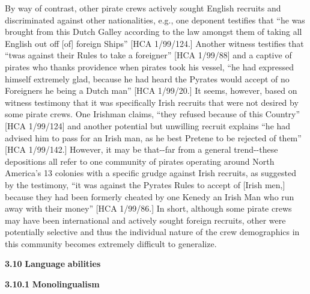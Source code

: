 By way of contrast, other pirate crews actively sought English recruits and discriminated against other nationalities, e.g., one deponent testifies that “he was brought from this Dutch Galley according to the law amongst them of taking all English out off [of]   foreign Ships” [HCA 1/99/124.] Another witness testifies that “twas against their Rules to take a foreigner” [HCA 1/99/88] and a captive of pirates who thanks providence when pirates took his vessel, “he had expressed himself extremely glad, because he had heard the Pyrates would accept of no Foreigners he being a Dutch man” [HCA 1/99/20.] It seems, however, based on witness testimony that it was specifically Irish recruits that were not desired by some pirate crews. One Irishman claims, “they refused because of this Country” [HCA 1/99/124] and another potential but unwilling recruit explains “he had advised him to pass for an Irish man, as he best Pretene to be rejected of them” [HCA 1/99/142.] However, it may be that-{}-far from a general trend-{}-these depositions all refer to one community of pirates operating around North America’s 13 colonies with a specific grudge against Irish recruits, as suggested by the testimony, “it was against the Pyrates Rules to accept of [Irish men,] because they had been formerly cheated by one Kenedy an Irish Man who run away with their money” [HCA 1/99/86.] In short, although some pirate crews may have been international and actively sought foreign recruits, other were potentially selective and thus the individual nature of the crew demographics in this community becomes extremely difficult to generalize.  

\textbf{3.10} \textbf{Language} \textbf{abilities} 

  \textbf{3.10.1} \textbf{Monolingualism}

